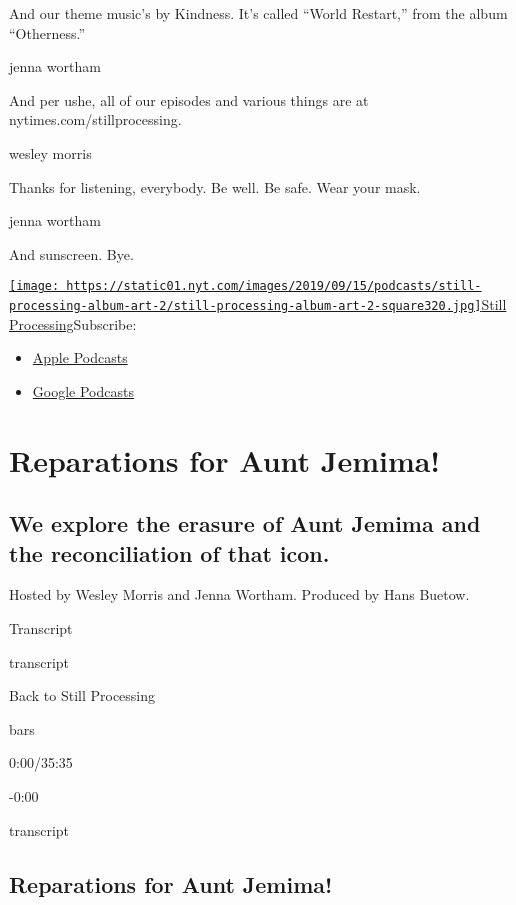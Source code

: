 And our theme music's by Kindness. It's called ``World Restart,'' from
the album ``Otherness.''

jenna wortham

And per ushe, all of our episodes and various things are at
nytimes.com/stillprocessing.

wesley morris

Thanks for listening, everybody. Be well. Be safe. Wear your mask.

jenna wortham

And sunscreen. Bye.

\href{https://www.nytimes.com/column/still-processing-podcast}{\texttt{[image: https://static01.nyt.com/images/2019/09/15/podcasts/still-processing-album-art-2/still-processing-album-art-2-square320.jpg]}Still
Processing}Subscribe:

\begin{itemize}
\tightlist
\item
  \href{https://itunes.apple.com/us/podcast/id1151436460}{Apple
  Podcasts}
\item
  \href{https://www.google.com/podcasts?feed=aHR0cHM6Ly9yc3MuYXJ0MTkuY29tL255dC1zdGlsbC1wcm9jZXNzaW5n}{Google
  Podcasts}
\end{itemize}

\hypertarget{reparations-for-aunt-jemima-1}{%
\section{Reparations for Aunt
Jemima!}\label{reparations-for-aunt-jemima-1}}

\hypertarget{we-explore-the-erasure-of-aunt-jemima-and-the-reconciliation-of-that-icon-1}{%
\subsection{We explore the erasure of Aunt Jemima and the reconciliation
of that
icon.}\label{we-explore-the-erasure-of-aunt-jemima-and-the-reconciliation-of-that-icon-1}}

Hosted by Wesley Morris and Jenna Wortham. Produced by Hans Buetow.

Transcript

transcript

Back to Still Processing

bars

0:00/35:35

-0:00

transcript

\hypertarget{reparations-for-aunt-jemima-2}{%
\subsection{Reparations for Aunt
Jemima!}\label{reparations-for-aunt-jemima-2}}

